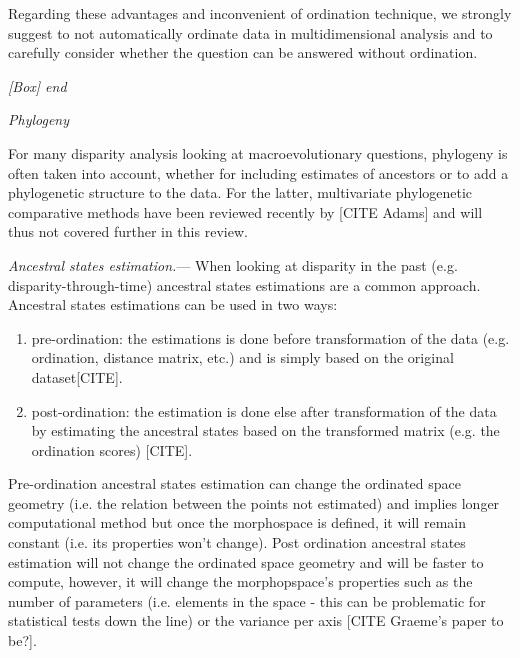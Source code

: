 \documentclass[12pt,letterpaper]{article}
\renewcommand{\subsection}[1]{%
\bigskip
\begin{center}
\begin{large}
\normalfont\itshape #1
\end{large}
\end{center}}
\renewcommand{\subsubsection}[1]{%
\vspace{2ex}
\noindent
\textit{#1.}---}
\begin{document}
Regarding these advantages and inconvenient of ordination technique, we strongly suggest to not automatically ordinate data in multidimensional analysis and to carefully consider whether the question can be answered without ordination.
\subsection{[Box] end}

\subsection{Phylogeny}
For many disparity analysis looking at macroevolutionary questions, phylogeny is often taken into account, whether for including estimates of ancestors or to add a phylogenetic structure to the data.
For the latter, multivariate phylogenetic comparative methods have been reviewed recently by [CITE Adams] %
and will thus not covered further in this review.

\subsubsection{Ancestral states estimation}
When looking at disparity in the past (e.g. disparity-through-time) ancestral states estimations are a common approach.
Ancestral states estimations can be used in two ways:
\begin{enumerate}
\item pre-ordination: the estimations is done before transformation of the data (e.g. ordination, distance matrix, etc.) and is simply based on the original dataset[CITE].
\item post-ordination: the estimation is done else after transformation of the data by estimating the ancestral states based on the transformed matrix (e.g. the ordination scores) [CITE].
\end{enumerate}
Pre-ordination ancestral states estimation can change the ordinated space geometry (i.e. the relation between the points not estimated) and implies longer computational method but once the morphospace is defined, it will remain constant (i.e. its properties won't change).
Post ordination ancestral states estimation will not change the ordinated space geometry and will be faster to compute, however, it will change the morphopspace's properties such as the number of parameters (i.e. elements in the space - this can be problematic for statistical tests down the line) or the variance per axis [CITE Graeme's paper to be?].
\end{document}
